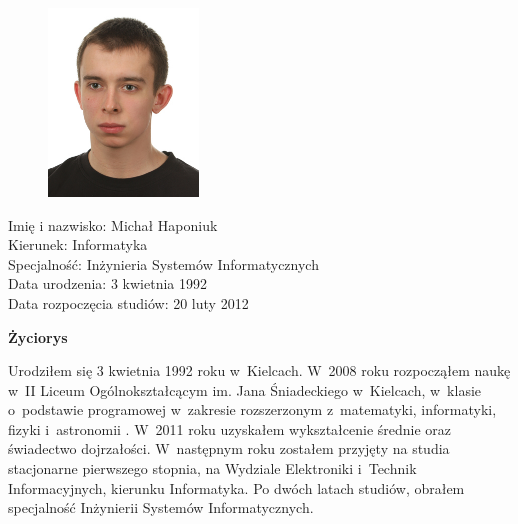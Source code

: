 \documentclass[a4paper,12pt,oneside]{mwrep}  %
\begin{document}
\pagestyle{empty}
\cleardoublepage 


\def\abstract{
   \vfil
   \begin{center}%
	   {\bfseries {\Large \abstractname}}%
   \end{center}
   \quotation
   }
   
   \def\endabstract{\par
   \endquotation
   }
   \thispagestyle{empty}
   
{
\begin{figure}
\begin{center}
\includegraphics[width=4cm]{grafika/HAPONIUK_MICHAL.jpg}
\end{center}
\end{figure}


\setlength{\parindent}{0pt} %
\setlength{\baselineskip}{1.6\baselineskip}
Imię i nazwisko: \hfill Michał Haponiuk\\
Kierunek: \hfill Informatyka\\
Specjalność: \hfill Inżynieria Systemów Informatycznych\\
Data urodzenia: \hfill 3 kwietnia 1992\\
Data rozpoczęcia studiów: \hfill 20 luty 2012\\


\begin{center}
{\bfseries {\Large Życiorys}}%
\end{center}
\vspace{0.5cm}
\setlength{\baselineskip}{0.625\baselineskip}
Urodziłem się 3 kwietnia 1992 roku w~Kielcach. W~2008 roku rozpocząłem naukę w~II Liceum Ogólnokształcącym im. Jana Śniadeckiego w~Kielcach, w~klasie o~podstawie programowej w~zakresie rozszerzonym z~matematyki, informatyki, fizyki i~astronomii . W~2011 roku uzyskałem wykształcenie średnie oraz świadectwo dojrzałości. W~następnym roku zostałem przyjęty na studia stacjonarne pierwszego stopnia, na Wydziale Elektroniki i~Technik Informacyjnych, kierunku Informatyka. Po dwóch latach studiów, obrałem specjalność Inżynierii Systemów Informatycznych.

}
\end{document}
